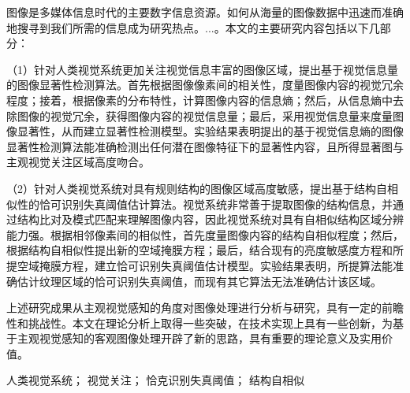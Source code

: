 
\begin{cabstract}
图像是多媒体信息时代的主要数字信息资源。如何从海量的图像数据中迅速而准确地搜寻到我们所需的信息成为研究热点。...。本文的主要研究内容包括以下几部分：

（1）针对人类视觉系统更加关注视觉信息丰富的图像区域，提出基于视觉信息量的图像显著性检测算法。首先根据图像像素间的相关性，度量图像内容的视觉冗余程度；接着，根据像素的分布特性，计算图像内容的信息熵；然后，从信息熵中去除图像的视觉冗余，获得图像内容的视觉信息量；最后，采用视觉信息量来度量图像显著性，从而建立显著性检测模型。实验结果表明提出的基于视觉信息熵的图像显著性检测算法能准确检测出任何潜在图像特征下的显著性内容，且所得显著图与主观视觉关注区域高度吻合。

（2）针对人类视觉系统对具有规则结构的图像区域高度敏感，提出基于结构自相似性的恰可识别失真阈值估计算法。视觉系统非常善于提取图像的结构信息，并通过结构比对及模式匹配来理解图像内容，因此视觉系统对具有自相似结构区域分辨能力强。根据相邻像素间的相似性，首先度量图像内容的结构自相似程度；然后，根据结构自相似性提出新的空域掩膜方程；最后，结合现有的亮度敏感度方程和所提空域掩膜方程，建立恰可识别失真阈值估计模型。实验结果表明，所提算法能准确估计纹理区域的恰可识别失真阈值，而现有其它算法无法准确估计该区域。

上述研究成果从主观视觉感知的角度对图像处理进行分析与研究，具有一定的前瞻性和挑战性。本文在理论分析上取得一些突破，在技术实现上具有一些创新，为基于主观视觉感知的客观图像处理开辟了新的思路，具有重要的理论意义及实用价值。

\end{cabstract}


\begin{ckeywords}
人类视觉系统； 视觉关注； 恰克识别失真阈值； 结构自相似
\end{ckeywords}



